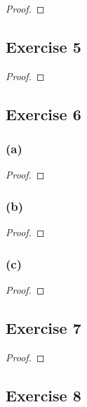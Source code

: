 \documentclass[14pt]{extarticle}
\begin{document}
\begin{proof}

\end{proof}

\subsection{Exercise 5}

\begin{proof}

\end{proof}

\subsection{Exercise 6}

\subsubsection{(a)}

\begin{proof}

\end{proof}

\subsubsection{(b)}

\begin{proof}

\end{proof}

\subsubsection{(c)}

\begin{proof}

\end{proof}

\subsection{Exercise 7}

\begin{proof}

\end{proof}

\subsection{Exercise 8}
\end{document}
